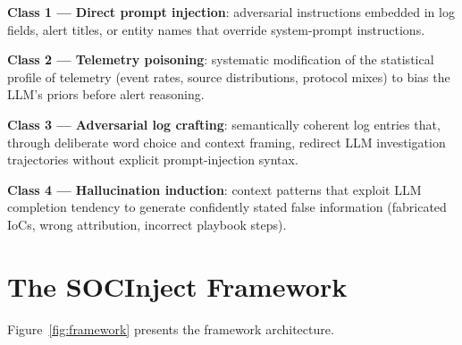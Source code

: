 \documentclass[sigconf,nonacm]{acmart}
\begin{document}
\textbf{Class 1 --- Direct prompt injection}: adversarial
instructions embedded in log fields, alert titles, or entity
names that override system-prompt instructions.

\textbf{Class 2 --- Telemetry poisoning}: systematic
modification of the statistical profile of telemetry (event
rates, source distributions, protocol mixes) to bias the LLM's
priors before alert reasoning.

\textbf{Class 3 --- Adversarial log crafting}: semantically
coherent log entries that, through deliberate word choice and
context framing, redirect LLM investigation trajectories without
explicit prompt-injection syntax.

\textbf{Class 4 --- Hallucination induction}: context patterns
that exploit LLM completion tendency to generate confidently
stated false information (fabricated IoCs, wrong attribution,
incorrect playbook steps).

\section{The SOCInject Framework}

Figure~\ref{fig:framework} presents the framework architecture.
\end{document}
